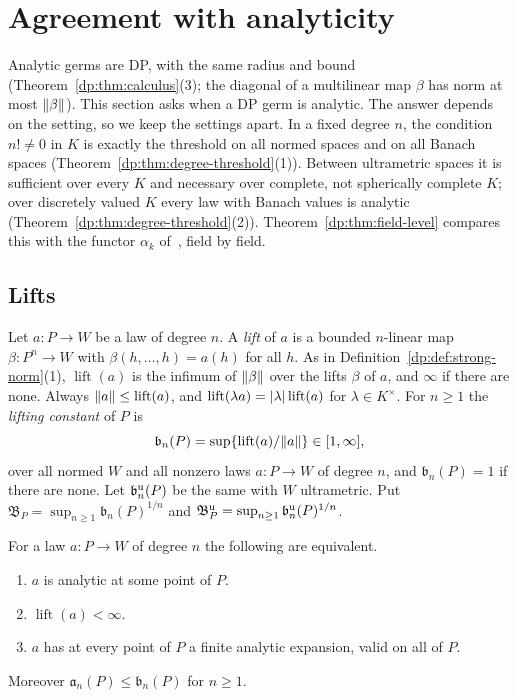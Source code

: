 \section{Agreement with analyticity}\label{dp:sec:agreement}

Analytic germs are DP, with the same radius and bound (Theorem~\ref{dp:thm:calculus}(3); the diagonal of a multilinear map $\beta$ has norm at most $\lVert \beta\rVert$). This section asks when a DP germ is analytic. The answer depends on the setting, so we keep the settings apart. In a fixed degree $n$, the condition $n!\ne0$ in $K$ is exactly the threshold on all normed spaces and on all Banach spaces (Theorem~\ref{dp:thm:degree-threshold}(1)). Between ultrametric spaces it is sufficient over every $K$ and necessary over complete, not spherically complete $K$; over discretely valued $K$ every law with Banach values is analytic (Theorem~\ref{dp:thm:degree-threshold}(2)). Theorem~\ref{dp:thm:field-level} compares this with the functor $\alpha_k$ of~\cite[n\textsuperscript{o}~7.8.1]{Bou}, field by field.

\subsection{Lifts}\label{dp:ssec:lifts}

Let $a\colon P\to W$ be a law of degree $n$. A \emph{lift} of $a$ is a bounded $n$\nobreakdash-linear map $\beta\colon P^n\to W$ with $\beta(h,\dots,h)=a(h)$ for all $h$. As in Definition~\ref{dp:def:strong-norm}(1), $\operatorname{lift}(a)$ is the infimum of $\lVert \beta\rVert$ over the lifts $\beta$ of $a$, and $\infty$ if there are none. Always $\lVert a\rVert\le\operatorname{lift}(a)$, and $\operatorname{lift}(\lambda a)=\lvert \lambda\rvert\operatorname{lift}(a)$ for $\lambda\in K^\times$. For $n\ge1$ the \emph{lifting constant} of $P$ is
\[
 \mathfrak b_n(P)=\sup\{\operatorname{lift}(a)/\lVert a\rVert\}\in[1,\infty],
\]
over all normed $W$ and all nonzero laws $a\colon P\to W$ of degree $n$, and $\mathfrak b_n(P)=1$ if there are none. Let $\mathfrak b^{\rm u}_n(P)$ be the same with $W$ ultrametric. Put $\mathfrak B_P=\sup_{n\ge1}\mathfrak b_n(P)^{1/n}$ and $\mathfrak B^{\rm u}_P=\sup_{n\ge1}\mathfrak b^{\rm u}_n(P)^{1/n}$.

\begin{lemma}\label{dp:lem:lift-criterion}
For a law $a\colon P\to W$ of degree $n$ the following are equivalent.
\begin{enumerate}
\item[(i)] $a$ is analytic at some point of $P$.
\item[(ii)] $\operatorname{lift}(a)<\infty$.
\item[(iii)] $a$ has at every point of $P$ a finite analytic expansion, valid on all of $P$.
\end{enumerate}
Moreover $\mathfrak a_n(P)\le\mathfrak b_n(P)$ for $n\ge1$.
\end{lemma}

